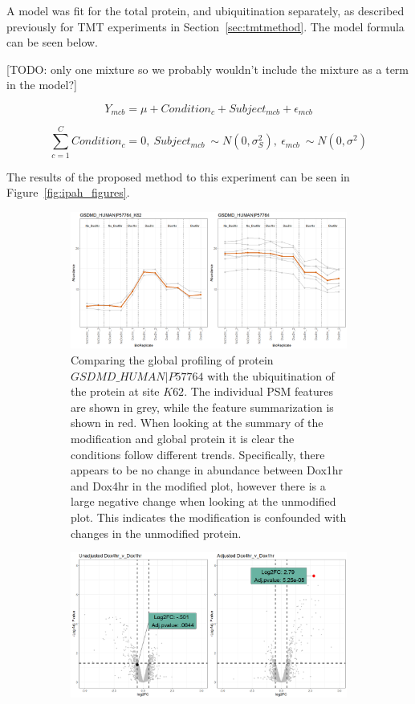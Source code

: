 \documentclass{mcp}
\def\todo#1{{\color{red}[TODO: #1]}}
\def\sfigref#1{{Figure~\ref{#1}}}
\begin{document}
A model was fit for the total protein, and ubiquitination separately, as described previously for TMT experiments in Section~\ref{sec:tmtmethod}. The model formula can be seen below.

\todo{only one mixture so we probably wouldn't include the mixture as a term in the model?}

$$Y_{mcb} = \mu + Condition_c + Subject_{mcb} + \epsilon_{mcb}$$

$$\sum_{c=1}^C{Condition_c} = 0 ,\: Subject_{mcb} ~ \sim N(0, \sigma^2_S) ,\: \epsilon_{mcb} ~ \sim N(0, \sigma^2)$$

The results of the proposed method to this experiment can be seen in \sfigref{fig:ipah_figures}.

\begin{figure}[h!]
\centering
 \begin{subfigure}{\textwidth}
	\includegraphics[width=\textwidth]{sim_new/IpaH_prof_plot}
	\caption{Comparing the global profiling of protein $GSDMD\_HUMAN|P57764$ with the ubiquitination of the protein at site $K62$. The individual PSM features are shown in grey, while the feature summarization is shown in red. When looking at the summary of the modification and global protein it is clear the conditions follow different trends. Specifically, there appears to be no change in abundance between Dox1hr and Dox4hr in the modified plot, however there is a large negative change when looking at the unmodified plot. This indicates the modification is confounded with changes in the unmodified protein.}
 \end{subfigure}
 \begin{subfigure}{\textwidth}
	\includegraphics[width=\textwidth]{sim_new/IpaH_volcano_plot}

\end{subfigure}
\end{figure}
\end{document}
